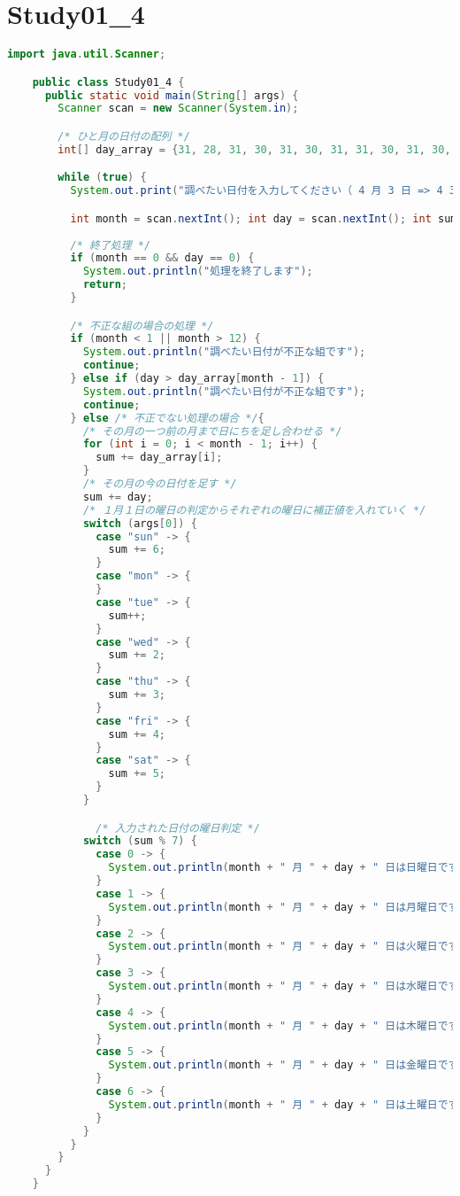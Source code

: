 \documentclass{jlreq}
\begin{document}
  \section*{Study01\_4}
  \begin{lstlisting}[caption=Study01\_4.javaのソースコード, label=code:in, language=java]
    import java.util.Scanner;

    public class Study01_4 {
      public static void main(String[] args) {
        Scanner scan = new Scanner(System.in);

        /* ひと月の日付の配列 */
        int[] day_array = {31, 28, 31, 30, 31, 30, 31, 31, 30, 31, 30, 31};

        while (true) {
          System.out.print("調べたい日付を入力してください（ 4 月 3 日 => 4 3）: ");

          int month = scan.nextInt(); int day = scan.nextInt(); int sum = 0;
          
          /* 終了処理 */
          if (month == 0 && day == 0) {
            System.out.println("処理を終了します");
            return;
          }

          /* 不正な組の場合の処理 */
          if (month < 1 || month > 12) {
            System.out.println("調べたい日付が不正な組です");
            continue;
          } else if (day > day_array[month - 1]) {
            System.out.println("調べたい日付が不正な組です");
            continue;
          } else /* 不正でない処理の場合 */{
            /* その月の一つ前の月まで日にちを足し合わせる */
            for (int i = 0; i < month - 1; i++) {
              sum += day_array[i];
            }
            /* その月の今の日付を足す */
            sum += day;
            /* １月１日の曜日の判定からそれぞれの曜日に補正値を入れていく */
            switch (args[0]) {
              case "sun" -> {
                sum += 6;
              }
              case "mon" -> {
              }
              case "tue" -> {
                sum++;
              }
              case "wed" -> {
                sum += 2;
              }
              case "thu" -> {
                sum += 3;
              }
              case "fri" -> {
                sum += 4;
              }
              case "sat" -> {
                sum += 5;
              }
            }

              /* 入力された日付の曜日判定 */
            switch (sum % 7) {
              case 0 -> {
                System.out.println(month + " 月 " + day + " 日は日曜日です");
              }
              case 1 -> {
                System.out.println(month + " 月 " + day + " 日は月曜日です");
              }
              case 2 -> {
                System.out.println(month + " 月 " + day + " 日は火曜日です");
              }
              case 3 -> {
                System.out.println(month + " 月 " + day + " 日は水曜日です");
              }
              case 4 -> {
                System.out.println(month + " 月 " + day + " 日は木曜日です");
              }
              case 5 -> {
                System.out.println(month + " 月 " + day + " 日は金曜日です");
              }
              case 6 -> {
                System.out.println(month + " 月 " + day + " 日は土曜日です");
              }
            }
          }
        }
      }
    }
  \end{lstlisting}
\end{document}
